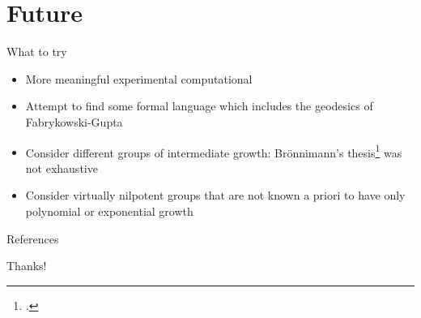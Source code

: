 \documentclass{beamer}
\begin{document}
\section{Future}

\begin{frame}{What to try}

\begin{itemize}
\item
More meaningful experimental computational

\vspace{1em}

\item
Attempt to find some formal language which includes the geodesics of Fabrykowski-Gupta

\vspace{1em}

\item
Consider different groups of intermediate growth: Br\"onnimann's thesis\footcite{Julie2016GeodesicGrowth} was not exhaustive

\vspace{1em}

\item
Consider virtually nilpotent groups that are not known a priori to have only polynomial or exponential growth

\end{itemize}

\end{frame}

\begin{frame}{References}
\printbibliography[heading=none]
\end{frame}

\begin{frame}[standout]
Thanks!
\end{frame}
\end{document}
